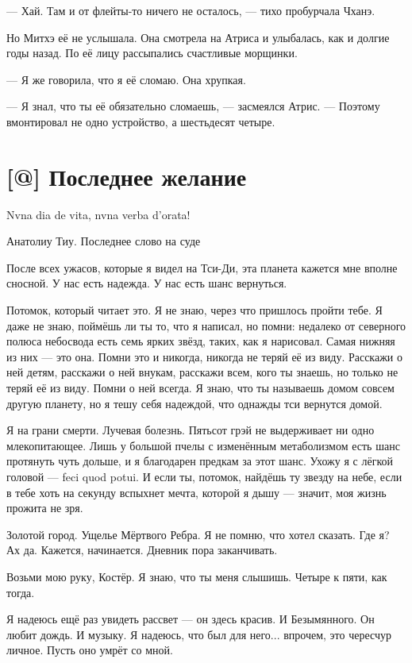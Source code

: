 --- Хай.
Там и от флейты-то ничего не осталось, --- тихо пробурчала Чханэ.

Но Митхэ её не услышала.
Она смотрела на Атриса и улыбалась, как и долгие годы назад.
По её лицу рассыпались счастливые морщинки.

--- Я же говорила, что я её сломаю.
Она хрупкая.

--- Я знал, что ты её обязательно сломаешь, --- засмеялся Атрис.
--- Поэтому вмонтировал не одно устройство, а шестьдесят четыре.

\section{[@] Последнее желание}

\epigraph
{Nvna dia de vita, nvna verba d'orata\FM!}
{Анатолиу Тиу.
Последнее слово на суде}

\textspace

После всех ужасов, которые я видел на Тси-Ди, эта планета кажется мне вполне сносной.
У нас есть надежда.
У нас есть шанс вернуться.

Потомок, который читает это.
Я не знаю, через что пришлось пройти тебе.
Я даже не знаю, поймёшь ли ты то, что я написал, но помни: недалеко от северного полюса небосвода есть семь ярких звёзд, таких, как я нарисовал.
Самая нижняя из них --- это она.
Помни это и никогда, никогда не теряй её из виду.
Расскажи о ней детям, расскажи о ней внукам, расскажи всем, кого ты знаешь, но только не теряй её из виду.
Помни о ней всегда.
Я знаю, что ты называешь домом совсем другую планету, но я тешу себя надеждой, что однажды тси вернутся домой.

Я на грани смерти.
Лучевая болезнь.
Пятьсот грэй не выдерживает ни одно млекопитающее.
Лишь у большой пчелы с изменённым метаболизмом есть шанс протянуть чуть дольше, и я благодарен предкам за этот шанс.
Ухожу я с лёгкой головой --- feci quod potui.
И если ты, потомок, найдёшь ту звезду на небе, если в тебе хоть на секунду вспыхнет мечта, которой я дышу --- значит, моя жизнь прожита не зря.

Золотой город.
Ущелье Мёртвого Ребра.
Я не помню, что хотел сказать.
Где я?
Ах да.
Кажется, начинается.
Дневник пора заканчивать.

Возьми мою руку, Костёр.
Я знаю, что ты меня слышишь.
Четыре к пяти, как тогда.

Я надеюсь ещё раз увидеть рассвет --- он здесь красив.
И Безымянного.
Он любит дождь.
И музыку.
Я надеюсь, что был для него... впрочем, это чересчур личное.
Пусть оно умрёт со мной.

